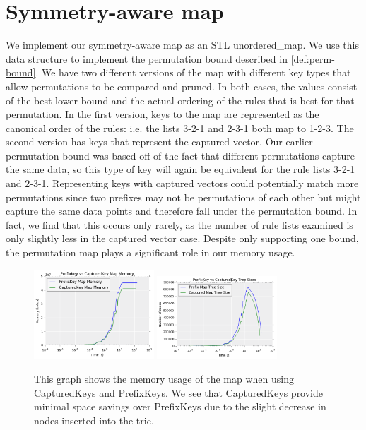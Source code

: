 \documentclass[]{report}
\theoremstyle{definition}
\begin{document}
\section{Symmetry-aware map}
We implement our symmetry-aware map as an STL unordered\_map.
We use this data structure to implement the permutation bound described in \ref{def:perm-bound}.
We have two different versions of the map with different key types that allow permutations to be compared and pruned.
In both cases, the values consist of the best lower bound and the actual ordering of the rules that is best for that permutation.
In the first version, keys to the map are represented as the canonical order of the rules: i.e. the lists 3-2-1 and 2-3-1 both map to 1-2-3.
The second version has keys that represent the captured vector.
Our earlier permutation bound was based off of the fact that different permutations capture the same data, so this type of key will again be equivalent for the rule lists 3-2-1 and 2-3-1.
Representing keys with captured vectors could potentially match more permutations since two prefixes may not be permutations of each other but might capture the same data points and therefore fall under the permutation bound.
In fact, we find that this occurs only rarely, as the number of rule lists examined is only slightly less in the captured vector case.
Despite only supporting one bound, the permutation map plays a significant role in our memory usage.

\begin{figure}[t!]
\begin{center}
\includegraphics[width=0.4\textwidth]{figs/prefix-captured_pmap_mem.png}
\includegraphics[width=0.4\textwidth]{figs/prefix-captured_tree_size.png}
\end{center}
\caption{This graph shows the memory usage of the map when using CapturedKeys and PrefixKeys. We see that CapturedKeys provide minimal space savings over PrefixKeys due to the slight decrease in nodes inserted into the trie.}
\label{fig:prefix-captured}
\end{figure}
\end{document}
